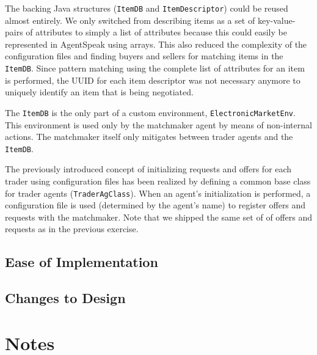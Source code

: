 \documentclass[a4paper,11pt]{article}
\begin{document}
\noindent The backing Java structures (\texttt{ItemDB} and \texttt{ItemDescriptor}) could be reused almost entirely. We only switched from describing items as a set of key-value-pairs of attributes to simply a list of attributes because this could easily be represented in AgentSpeak using arrays. This also reduced the complexity of the configuration files and finding buyers and sellers for matching items in the \texttt{ItemDB}. Since pattern matching using the complete list of attributes for an item is performed, the UUID for each item descriptor was not necessary anymore to uniquely identify an item that is being negotiated.

The \texttt{ItemDB} is the only part of a custom environment, \texttt{ElectronicMarketEnv}. This environment is used only by the matchmaker agent by means of non-internal actions. The matchmaker itself only mitigates between trader agents and the \texttt{ItemDB}.

The previously introduced concept of initializing requests and offers for each trader using configuration files has been realized by defining a common base class for trader agents (\texttt{TraderAgClass}). When an agent's initialization is performed, a configuration file is used (determined by the agent's name) to register offers and requests with the matchmaker. Note that we shipped the same set of of offers and requests as in the previous exercise.



\subsection{Ease of Implementation}


\subsection{Changes to Design}


\section{Notes}
\end{document}
